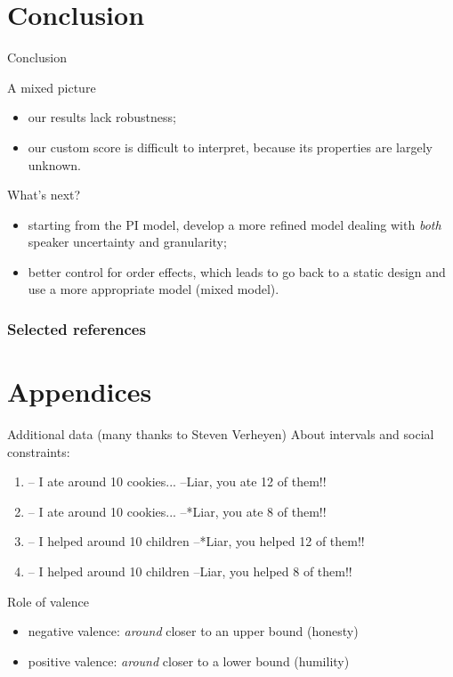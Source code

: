 \documentclass[xcolor=table, hyperref={pdfpagelabels=false}]{beamer}
\begin{document}
\section{Conclusion}
\begin{frame}{Conclusion}
	\begin{alertblock}{A mixed picture}
		\begin{itemize}
			\item our results lack robustness; \pause
			\item our custom score is difficult to interpret, because its properties are largely unknown. \pause
		\end{itemize}
	\end{alertblock}

	\begin{exampleblock}{What's next?}
		\begin{itemize}
			\item starting from the PI model, develop a more refined model dealing with \textit{both} speaker uncertainty and granularity; \pause
			\item better control for order effects, which leads to go back to a static design and use a more  appropriate model (mixed model).
		\end{itemize}
	\end{exampleblock}

\end{frame}
\begin{frame}[allowframebreaks]
\frametitle{Selected references}
\nocite{*}

\printbibliography
\end{frame}

\section{Appendices}
\begin{frame}{Additional data (many thanks to Steven Verheyen)}
About intervals and social constraints:
\begin{enumerate}
	[square]
	\item -- I ate around 10 cookies... --Liar, you ate 12 of them!!
	\item -- I ate around 10 cookies... --*Liar, you ate 8 of them!!
	\item -- I helped around 10 children --*Liar, you helped 12 of them!!
	\item -- I helped around 10 children --Liar, you helped 8 of them!!
	\label{end-enumerate}
\end{enumerate}
\begin{block}{Role of valence}
	\begin{itemize}
		\item negative valence: \textit{around} closer to an upper bound (honesty)
		\item positive valence: \textit{around} closer to a lower bound (humility)
	\end{itemize}
\end{block}

\end{frame}
\end{document}
